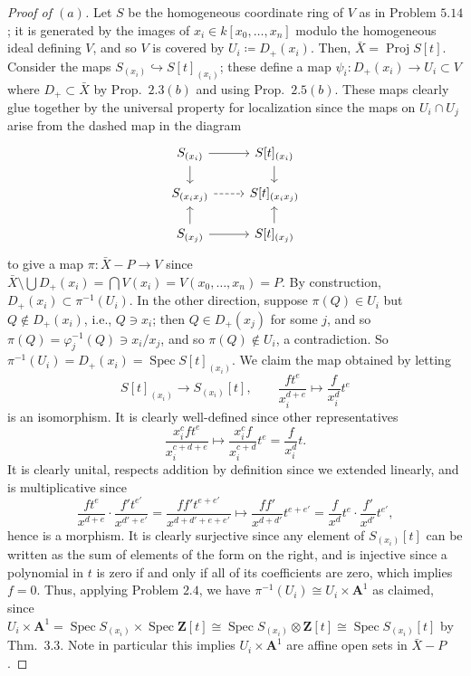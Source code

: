 \documentclass[12pt,letterpaper]{article}
\theoremstyle{definition}
\theoremstyle{remark}
\numberwithin{equation}{section}
\numberwithin{figure}{problem}
\DeclareMathOperator{\Spec}{Spec}
\DeclareMathOperator{\Proj}{Proj}
\begin{document}
\begin{proof}[Proof of $(a)$]
  Let $S$ be the homogeneous coordinate ring of $V$ as in Problem $5.14$; it is generated by the images of $x_i \in k[x_0,\ldots,x_n]$ modulo the homogeneous ideal defining $V$, and so $V$ is covered by $U_i \coloneqq D_+(x_i)$. Then, $\bar{X} = \Proj S[t]$. Consider the maps $S_{(x_i)} \hookrightarrow S[t]_{(x_i)}$; these define a map $\psi_i \colon D_+(x_i) \to U_i \subset V$ where $D_+ \subset \bar{X}$ by Prop.~$2.3(b)$ and using Prop.~$2.5(b)$. These maps clearly glue together by the universal property for localization \cite[Prop.~3.1]{AM69} since the maps on $U_i \cap U_j$ arise from the dashed map in the diagram
  \begin{equation*}
    \begin{tikzcd}[row sep=scriptsize]
      S_{(x_i)} \rar\dar & S[t]_{(x_i)}\dar\\
      S_{(x_ix_j)}\rar[dashed] & S[t]_{(x_ix_j)}\\
      S_{(x_j)} \rar\uar & S[t]_{(x_j)}\uar
    \end{tikzcd}
  \end{equation*}
  to give a map $\pi\colon\bar{X} - P \to V$ since $\bar{X} \setminus \bigcup D_+(x_i) = \bigcap V(x_i) = V(x_0,\ldots,x_n) = P$. By construction, $D_+(x_i) \subset \pi^{-1}(U_i)$. In the other direction, suppose $\pi(Q) \in U_i$ but $Q \notin D_+(x_i)$, i.e., $Q \ni x_i$; then $Q \in D_+(x_j)$ for some $j$, and so $\pi(Q) = \varphi_j^{-1}(Q) \ni x_i/x_j$, and so $\pi(Q) \notin U_i$, a contradiction. So $\pi^{-1}(U_i) = D_+(x_i) = \Spec S[t]_{(x_i)}$. We claim the map obtained by letting
  \begin{equation*}
    S[t]_{(x_i)} \to S_{(x_i)}[t], \qquad \frac{ft^e}{x_i^{d+e}} \mapsto \frac{f}{x_i^d} t^e
  \end{equation*}
  is an isomorphism. It is clearly well-defined since other representatives
  \begin{equation*}
    \frac{x_i^cft^e}{x_i^{c+d+e}} \mapsto \frac{x_i^cf}{x_i^{c+d}} t^e = \frac{f}{x_i^d} t.
  \end{equation*}
  It is clearly unital, respects addition by definition since we extended linearly, and is multiplicative since
  \begin{equation*}
    \frac{ft^e}{x^{d+e}} \cdot \frac{f't^{e'}}{x^{d'+e'}} = \frac{ff't^{e+e'}}{x^{d+d'+e+e'}} \mapsto \frac{ff'}{x^{d+d'}}t^{e+e'} = \frac{f}{x^d}t^e \cdot \frac{f'}{x^{d'}}t^{e'},
  \end{equation*}
  hence is a morphism. It is clearly surjective since any element of $S_{(x_i)}[t]$ can be written as the sum of elements of the form on the right, and is injective since a polynomial in $t$ is zero if and only if all of its coefficients are zero, which implies $f=0$. Thus, applying Problem $2.4$, we have $\pi^{-1}(U_i) \cong U_i \times \mathbf{A}^1$ as claimed, since $U_i \times \mathbf{A}^1 = \Spec S_{(x_i)} \times \Spec \mathbf{Z}[t] \cong \Spec S_{(x_i)} \otimes \mathbf{Z}[t] \cong \Spec S_{(x_i)}[t]$ by Thm.~3.3. Note in particular this implies $U_i \times \mathbf{A}^1$ are affine open sets in $\bar{X} - P$.

\end{proof}
\end{document}
